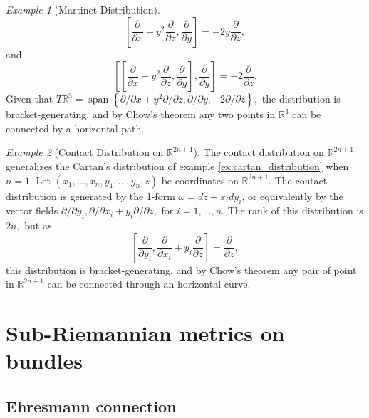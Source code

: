 \documentclass [xcolor=svgnames, t] {beamer}
\theoremstyle{definition}
\theoremstyle{plain}
\theoremstyle{remark}
\newtheorem{ex}{Example}
\begin{document}
\begin{frame}
\begin{ex}[Martinet Distribution]
	$$ \left[ \frac{\partial }{\partial x} + y^2 \frac{\partial }{\partial z} , \frac{\partial }{\partial y}  \right] =-2y \frac{\partial }{\partial z}, $$ 
	and 
	$$ \left[\left[ \frac{\partial }{\partial x} + y^2 \frac{\partial }{\partial z} , \frac{\partial }{\partial y}  \right], \frac{\partial }{\partial y} \right] = -2 \frac{\partial }{\partial z}.  $$ 
	Given that $ T \mathbb{R}^3 = \operatorname{span} \left\{ \partial/\partial x+ y^2\partial/\partial z, \partial/\partial y, -2\partial/\partial z \right\},  $ the distribution is bracket-generating, and by Chow's theorem any two points in $ \mathbb{R}^3 $ can be connected by a horizontal path. 
\end{ex}
\begin{ex}[Contact Distribution on $ \mathbb{R}^{2n+1} $]
	The contact distribution on $ \mathbb{R}^{2n+1} $ generalizes the Cartan's distribution of example \ref{ex:cartan_distribution} when $ n=1 $. Let $ (x_1,\dots,x_n,y_1,\dots, y_n,z) $ be coordinates on $ \mathbb{R}^{2n+1} $. The contact distribution is generated by the 1-form $ \omega = dz+ x_i dy_i$, or equivalently by the vector fields $ \partial/ \partial y_i, \partial/ \partial x_i+ y_i \partial/\partial z, $ for $ i=1,\dots, n. $ The rank of this distribution is $ 2n, $ but as 
	$$ \left[ \frac{\partial }{\partial y_i} , \frac{\partial }{\partial x_i} + y_i \frac{\partial }{\partial z}  \right] = \frac{\partial }{\partial z},  $$ 
	this distribution is bracket-generating, and by Chow's theorem any pair of point in $ \mathbb{R}^{2n+1} $ can be connected through an horizontal curve.
\end{ex}
\end{frame}
\section{Sub-Riemannian metrics on bundles}
\subsection{Ehresmann connection}%
\label{sub:ehresmann_connection}
\end{document}
